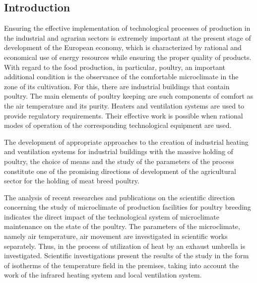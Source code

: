 \documentclass[12pt,twoside]{article}
\begin{document}
\begin{JGGarticle}
		\section{Introduction}
			Ensuring the effective implementation of technological processes of production in the industrial and agrarian sectors is extremely important at the present stage of development of the European economy, which is characterized by rational and economical use of energy resources while ensuring the proper quality of products. With regard to the food production, in particular, poultry, an important additional condition is the observance of the comfortable microclimate in the zone of its cultivation. For this, there are industrial buildings that contain poultry. The main elements of poultry keeping are such components of comfort as the air temperature and its purity. Heaters and ventilation systems are used to provide regulatory requirements. Their effective work is possible when rational modes of operation of the corresponding technological equipment are used.
			
			The development of appropriate approaches to the creation of industrial heating and ventilation systems for industrial buildings with the massive holding of poultry, the choice of means and the study of the parameters of the process constitute one of the promising directions of development of the agricultural sector for the holding of meat breed poultry.
			
			The analysis of recent researches and publications on the scientific direction concerning the study of microclimate of production facilities for poultry breeding indicates the direct impact of the technological system of microclimate maintenance on the state of the poultry. The parameters of the microclimate, namely air temperature, air movement are investigated in scientific works \cite{bi:Gumen-Martyn.2017,bi:Yurkevich-Spodyniuk.2015,bi:Petras-Kalus.2000,bi:Spodyniuk-Zhelykh.2010,bi:Gumen-Ljaskovska.2017,bi:Spodyniuk-Zhelykh.2008,bi:Kimball.2005,bi:Shcherbovskykh-Shepitchak.2016,bi:Shepitchak-Zhelykh.2015,bi:Zhelykh-Shepitchak.2015,bi:Zhelykh-Shepitchak.2016,bi:Shepitchak-Spodyniuk.2016,bi:Zhelykh-Kapalo.2008} separately. Thus, in \cite{bi:Spodyniuk-Zhelykh.2010} the process of utilization of heat by an exhaust umbrella is investigated. Scientific investigations \cite{bi:Yurkevich-Spodyniuk.2015,bi:Gumen-Ljaskovska.2017} present the results of the study in the form of isotherms of the temperature field in the premises, taking into account the work of the infrared heating system and local ventilation system.
			

\end{JGGarticle}
\end{document}
